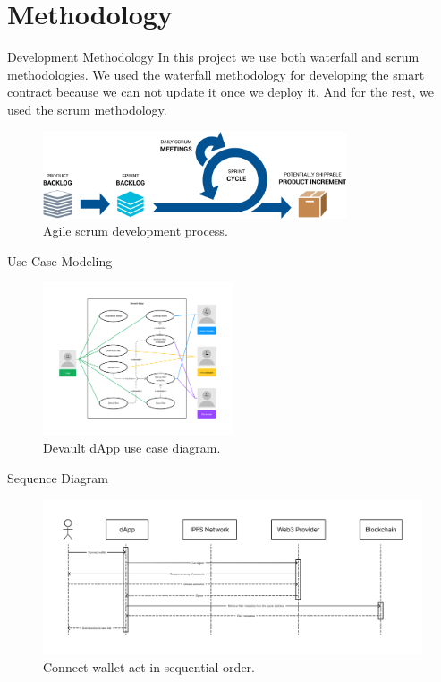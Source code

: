 \documentclass[aspectratio=169,usenames,dvipsnames,pdftex]{beamer}
\begin{document}
  \section{Methodology}

  \begin{frame}{Development Methodology}
    In this project we use both waterfall and scrum methodologies.
    We used the waterfall methodology for developing the smart contract because we can not update it once we deploy it. And for the rest, we used the scrum methodology.

    \begin{figure}
      \includegraphics[width=0.8\textwidth]{scrum.png}
      \caption{Agile scrum development process.}
    \end{figure}
  \end{frame}

  \begin{frame}{Use Case Modeling}
    \begin{figure}
      \includegraphics[width=0.5\textwidth]{dapp_uscs_dig.pdf}
      \caption{Devault dApp use case diagram.}
    \end{figure}
  \end{frame}

  \begin{frame}{Sequence Diagram}
    \begin{figure}
      \includegraphics[width=\textwidth]{connect_seq_dig.png}
      \caption{Connect wallet act in sequential order.}
    \end{figure}
  \end{frame}
\end{document}
